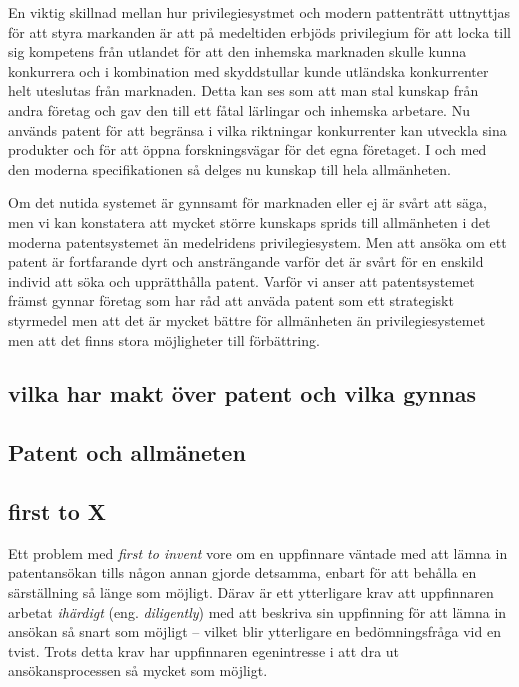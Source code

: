 En viktig skillnad mellan hur privilegiesystmet och modern pattenträtt uttnyttjas för att styra markanden är att på medeltiden erbjöds privilegium för att locka till sig kompetens från utlandet för att den inhemska marknaden skulle kunna konkurrera och i kombination med skyddstullar kunde utländska konkurrenter helt uteslutas från marknaden. Detta kan ses som att man stal kunskap från andra företag och gav den till ett fåtal lärlingar och inhemska arbetare. Nu används patent för att begränsa i vilka riktningar konkurrenter kan utveckla sina produkter och för att öppna forskningsvägar för det egna företaget. I och med den moderna specifikationen så delges nu kunskap till hela allmänheten. 

Om det nutida systemet är gynnsamt för marknaden eller ej är svårt att säga, men vi kan konstatera att mycket större kunskaps sprids till allmänheten i det moderna patentsystemet än medelridens privilegiesystem. Men att ansöka om ett patent är fortfarande dyrt och ansträngande varför det är svårt för en enskild individ att söka och upprätthålla patent. Varför vi anser att patentsystemet främst gynnar företag som har råd att anväda patent som ett strategiskt styrmedel men att det är mycket bättre för allmänheten än privilegiesystemet men att det finns stora möjligheter till förbättring.


\subsection*{vilka har makt över patent och vilka gynnas}


\subsection*{Patent och allmäneten}


\subsection{first to X}


Ett problem med \emph{first to invent} vore om en uppfinnare väntade med att lämna in patentansökan tills någon annan gjorde detsamma, enbart för att behålla en särställning så länge som möjligt. Därav är ett ytterligare krav att uppfinnaren arbetat \emph{ihärdigt} (eng. \emph{diligently}) med att beskriva sin uppfinning för att lämna in ansökan så snart som möjligt\cite{cmu-overview} -- vilket blir ytterligare en bedömningsfråga vid en tvist\cite{cmu-overview}. Trots detta krav har uppfinnaren egenintresse i att dra ut ansökansprocessen så mycket som möjligt.


